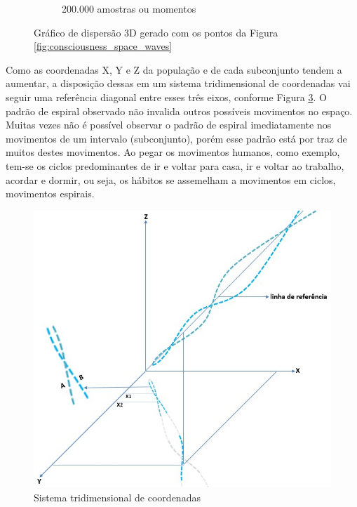 \begin{figure}[H]
\begin{subfigure}[H]{0.47\linewidth}
		\caption{200.000 amostras ou momentos}
		\label{fig:consciousness_space_3DScatter_200000-2}
		\end{subfigure}%
	\caption{Gráfico de dispersão 3D gerado com os pontos da Figura \ref{fig:consciousness_space_waves}}
	\end{figure}

Como as coordenadas X, Y e Z da população e de cada subconjunto tendem a aumentar, a disposição dessas em um sistema tridimensional de coordenadas vai seguir uma referência diagonal entre esses três eixos, conforme Figura \ref{fig:consciousness_space_spiral_reference_line}. O padrão de espiral observado não invalida outros possíveis movimentos no espaço. Muitas vezes não é possível observar o padrão de espiral imediatamente nos movimentos de um intervalo (subconjunto), porém esse padrão está por traz de muitos destes movimentos. Ao pegar os movimentos humanos, como exemplo, tem-se os ciclos predominantes de ir e voltar para casa, ir e voltar ao trabalho, acordar e dormir, ou seja, os hábitos se assemelham a movimentos em ciclos, movimentos espirais.
	\begin{figure}[H]
	\caption{Sistema tridimensional de coordenadas}
	\label{fig:consciousness_space_spiral_reference_line}
	\centering
	\includegraphics[scale=.6]{sections/images/consciousness_space_spiral_reference_line.jpg}
	\end{figure}


